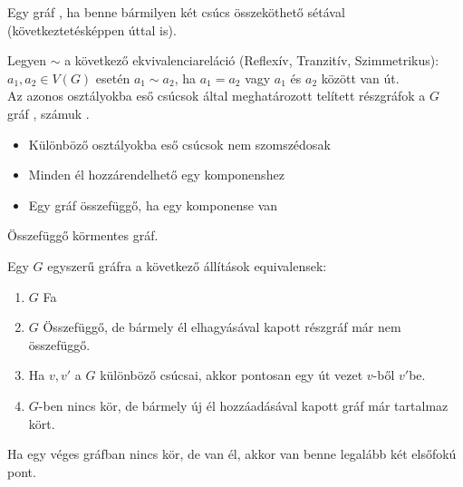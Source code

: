 \begin{frame}
\begin{tcolorbox}[title={Def.: Összeföggőség}]
Egy gráf , ha benne bármilyen két csúcs összeköthető sétával (következtetésképpen úttal is).
\end{tcolorbox}
\begin{tcolorbox}[title={Def.: Komponensek}]
Legyen $\sim$ a következő ekvivalenciareláció (Reflexív, Tranzitív, Szimmetrikus):\\
\mbigskip
$a_1, a_2 \in V(G)$ esetén $a_1 \sim a_2$, ha $a_1 = a_2$ vagy $a_1$ és $a_2$ között van út.\\
\mbigskip
Az azonos osztályokba eső csúcsok által meghatározott telített részgráfok a $G$ gráf , számuk .
\end{tcolorbox}
\begin{tcolorbox}[title={Ész}]
\begin{itemize}
\item Különböző osztályokba eső csúcsok nem szomszédosak
\item Minden él hozzárendelhető egy komponenshez
\item Egy gráf összefüggő, ha egy komponense van
\end{itemize}
\end{tcolorbox}
\end{frame}

\begin{frame}
\begin{tcolorbox}[title={Def.: Fa}]
Összefüggő körmentes gráf.
\end{tcolorbox}
\end{frame}

\begin{frame}
\begin{tcolorbox}[title={Tétel: Equivalens állítások fákra}]
Egy $G$ egyszerű gráfra a következő állítások equivalensek:
\begin{enumerate}
\item $G$ Fa
\item $G$ Összefüggő, de bármely él elhagyásával kapott részgráf már nem összefüggő.
\item Ha $v, v'$ a $G$ különböző csúcsai, akkor pontosan egy út vezet $v$-ből $v'$be.
\item $G$-ben nincs kör, de bármely új él hozzáadásával kapott gráf már tartalmaz kört.
\end{enumerate}
\end{tcolorbox}

\begin{tcolorbox}[title={Tétel: Elsőfokú pontok}]
Ha egy véges gráfban nincs kör, de van él, akkor van benne legalább két elsőfokú pont.
\end{tcolorbox}
\end{frame}

